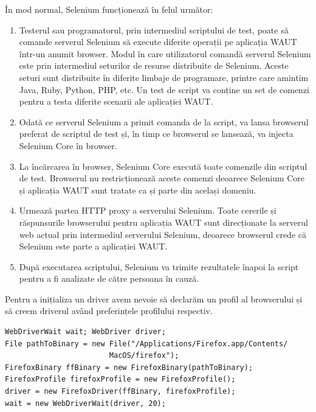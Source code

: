 \documentclass[12pt]{book}
\begin{document}
În mod normal, Selenium funcționează în felul următor:
\begin{addmargin}[4em]{1em}
	\begin{enumerate}
		\item Testerul sau programatorul, prin intermediul scriptului de test, poate să comande serverul Selenium să execute diferite operații pe aplicația WAUT 	într-un anumit browser. Modul în care utilizatorul comandă serverul Selenium este prin intermediul seturilor de resurse distribuite de Selenium. Aceste seturi sunt distribuite în diferite limbaje de programare, printre care amintim Java, Ruby, Python, PHP, etc. Un test de script va conține un set de comenzi pentru a testa diferite scenarii ale aplicației WAUT. 
		\item Odată ce serverul Selenium a primit comanda de la script, va lansa browserul preferat de scriptul de test și, în timp ce browserul se lansează, va injecta Selenium Core în browser.
		\item La încărcarea în browser, Selenium Core execută toate comenzile din scriptul de test. Browserul nu restricționează aceste comenzi deoarece Selenium Core și aplicația WAUT sunt tratate ca și parte din același domeniu.
		\item Urmează partea HTTP proxy a serverului Selenium. Toate cererile și răspunsurile browserului pentru aplicația WAUT sunt direcționate la serverul web actual prin intermediul serverului Selenium, deoarece browserul crede că Selenium este parte a aplicației WAUT. 
		\item După executarea scriptului, Selenium va trimite rezultatele înapoi la script pentru a fi analizate de către persoana în cauză.\cite{SeleniumBook}
	\end{enumerate}
\end{addmargin}

Pentru a inițializa un driver avem nevoie să declarăm un profil al browserului și să creem driverul având preferințele profilului respectiv.

\begin{lstlisting}[frame=single, caption=Inițializarea unui driver web]
WebDriverWait wait; WebDriver driver;
File pathToBinary = new File("/Applications/Firefox.app/Contents/
						MacOS/firefox"); 
FirefoxBinary ffBinary = new FirefoxBinary(pathToBinary); 
FirefoxProfile firefoxProfile = new FirefoxProfile(); 
driver = new FirefoxDriver(ffBinary, firefoxProfile);
wait = new WebDriverWait(driver, 20);
\end{lstlisting}
\end{document}
